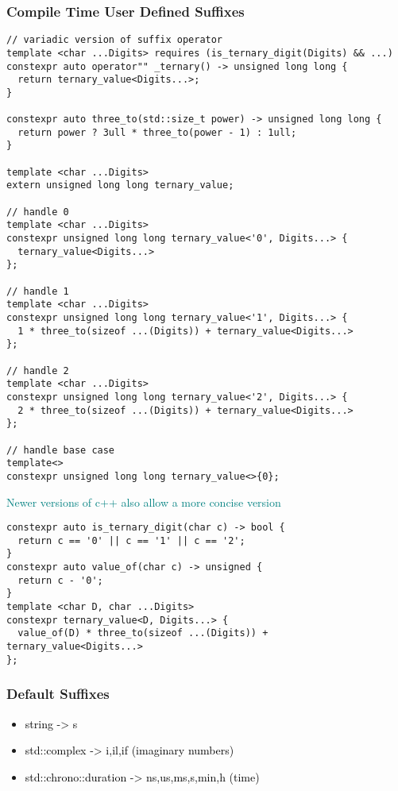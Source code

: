 \documentclass[main.tex,fontsize=8pt,paper=a4,paper=portrait,DIV=calc,]{scrartcl}
\begin{document}
\subsubsection{Compile Time User Defined Suffixes}
\begin{lstlisting}
// variadic version of suffix operator
template <char ...Digits> requires (is_ternary_digit(Digits) && ...)
constexpr auto operator"" _ternary() -> unsigned long long {
  return ternary_value<Digits...>;
}

constexpr auto three_to(std::size_t power) -> unsigned long long {
  return power ? 3ull * three_to(power - 1) : 1ull;
}

template <char ...Digits>
extern unsigned long long ternary_value;

// handle 0
template <char ...Digits>
constexpr unsigned long long ternary_value<'0', Digits...> {
  ternary_value<Digits...>
};

// handle 1
template <char ...Digits>
constexpr unsigned long long ternary_value<'1', Digits...> {
  1 * three_to(sizeof ...(Digits)) + ternary_value<Digits...>
};

// handle 2 
template <char ...Digits>
constexpr unsigned long long ternary_value<'2', Digits...> {
  2 * three_to(sizeof ...(Digits)) + ternary_value<Digits...>
};

// handle base case
template<>
constexpr unsigned long long ternary_value<>{0};
\end{lstlisting}
\textcolor{teal}{Newer versions of c++ also allow a more concise version}
\begin{lstlisting}
constexpr auto is_ternary_digit(char c) -> bool {
  return c == '0' || c == '1' || c == '2';
}
constexpr auto value_of(char c) -> unsigned {
  return c - '0';
}
template <char D, char ...Digits>
constexpr ternary_value<D, Digits...> {
  value_of(D) * three_to(sizeof ...(Digits)) + ternary_value<Digits...>
};
\end{lstlisting}

\subsubsection{Default Suffixes}
\begin{itemize}
\item \textcolor{black}{string -> s}
\item \textcolor{black}{std::complex -> i,il,if (imaginary numbers)}
\item \textcolor{black}{std::chrono::duration -> ns,us,ms,s,min,h (time)}
\end{itemize} 
\end{document}
